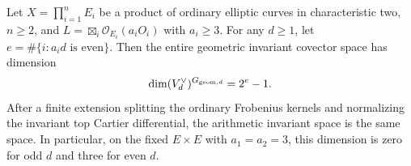 \begin{theorem}
\label{thm:product-char2-all-parities-fixed-quotient}
Let $X=\prod_{i=1}^n E_i$ be a product of ordinary elliptic
curves in characteristic two, $n\ge2$, and
$L=\boxtimes_i\mathcal O_{E_i}(a_iO_i)$ with $a_i\ge3$.
For any $d\ge1$, let
$e=\#\{i: a_i d\text{ is even}\}$.
Then the entire geometric invariant covector space has dimension
\[
             \dim(V_d^\vee)^{G_{{\rm geom},d}}=2^e-1.
\]
After a finite extension splitting the ordinary Frobenius kernels
and normalizing the invariant top Cartier differential, the
arithmetic invariant space is the same space.
In particular, on the fixed $E\times E$ with $a_1=a_2=3$,
this dimension is zero for odd $d$ and three for even $d$.
\end{theorem}

